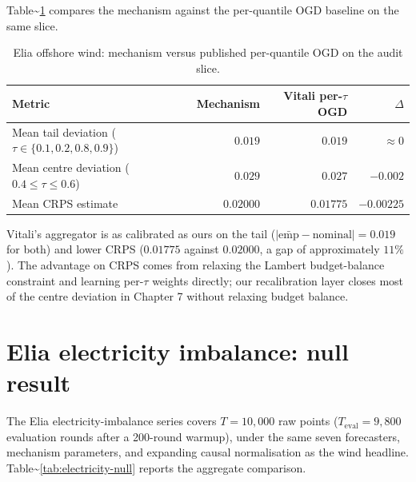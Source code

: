 \documentclass[
  11pt,
  a4paper,
  oneside]{report}
\begin{document}
Table\textasciitilde{}\ref{tab:vitali-audit} compares the mechanism
against the \citet{vitali2025intermittent} per-quantile OGD baseline on
the same slice.

\begin{table}[h]
\centering
\small
\begin{tabular}{lrrr}
\toprule
Metric & Mechanism & Vitali per-$\tau$ OGD & $\Delta$ \\
\midrule
Mean tail deviation ($\tau \in \{0.1, 0.2, 0.8, 0.9\}$)
  & $0.019$ & $0.019$ & $\approx 0$ \\
Mean centre deviation ($0.4 \leq \tau \leq 0.6$)
  & $0.029$ & $0.027$ & $-0.002$ \\
Mean CRPS estimate & $0.02000$ & $0.01775$ & $-0.00225$ \\
\bottomrule
\end{tabular}
\caption{Elia offshore wind: mechanism versus published per-quantile
OGD on the audit slice.}
\label{tab:vitali-audit}
\end{table}

Vitali's aggregator is as calibrated as ours on the tail
(\(|\bar{\text{emp}} - \text{nominal}| = 0.019\) for both) and lower
CRPS (\(0.01775\) against \(0.02000\), a gap of approximately \(11\%\)).
The advantage on CRPS comes from relaxing the Lambert budget-balance
constraint and learning per-\(\tau\) weights directly; our recalibration
layer closes most of the centre deviation in Chapter 7 without relaxing
budget balance.

\section{Elia electricity imbalance: null
result}\label{elia-electricity-imbalance-null-result}

The Elia electricity-imbalance series covers \(T = 10{,}000\) raw points
(\(T_\mathrm{eval} = 9{,}800\) evaluation rounds after a 200-round
warmup), under the same seven forecasters, mechanism parameters, and
expanding causal normalisation as the wind headline.
Table\textasciitilde{}\ref{tab:electricity-null} reports the aggregate
comparison.
\end{document}
